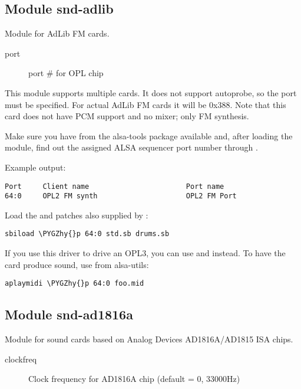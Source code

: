 \documentclass[a4paper,8pt,english]{sphinxmanual}
\def\PYGZhy{\char`\-}
\begin{document}
\subsection{Module snd-adlib}
\label{sound/alsa-configuration:module-snd-adlib}
Module for AdLib FM cards.
\begin{description}
\item[{port}] \leavevmode
port \# for OPL chip

\end{description}

This module supports multiple cards. It does not support autoprobe, so
the port must be specified. For actual AdLib FM cards it will be 0x388.
Note that this card does not have PCM support and no mixer; only FM
synthesis.

Make sure you have  from the alsa-tools package available and,
after loading the module, find out the assigned ALSA sequencer port
number through .

Example output:

\begin{Verbatim}[commandchars=\\\{\}]
Port     Client name                       Port name
64:0     OPL2 FM synth                     OPL2 FM Port
\end{Verbatim}

Load the  and  patches also supplied by :

\begin{Verbatim}[commandchars=\\\{\}]
sbiload \PYGZhy{}p 64:0 std.sb drums.sb
\end{Verbatim}

If you use this driver to drive an OPL3, you can use  and 
instead. To have the card produce sound, use  from alsa-utils:

\begin{Verbatim}[commandchars=\\\{\}]
aplaymidi \PYGZhy{}p 64:0 foo.mid
\end{Verbatim}


\subsection{Module snd-ad1816a}
\label{sound/alsa-configuration:module-snd-ad1816a}
Module for sound cards based on Analog Devices AD1816A/AD1815 ISA chips.
\begin{description}
\item[{clockfreq}] \leavevmode
Clock frequency for AD1816A chip (default = 0, 33000Hz)

\end{description}
\end{document}
